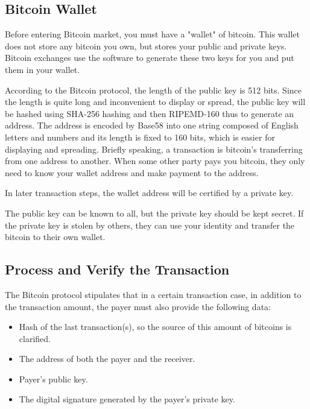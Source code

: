 \documentclass[12pt,a4paper]{article}
\begin{document}
\subsection{Bitcoin Wallet}
Before entering Bitcoin market, you must have a "wallet" of bitcoin. This wallet does not store any bitcoin you own, but stores your public and private keys. 
Bitcoin exchanges use the software to generate these two keys for you and put them in your wallet.

According to the Bitcoin protocol, the length of the public key is 512 bits. Since the length is quite long and inconvenient to display or spread, the public key will be hashed using SHA-256 hashing and then RIPEMD-160 thus to generate an address. The address is encoded by Base58 into one string composed of English letters and numbers and its length is fixed to 160 bits, which is easier for displaying and spreading. Briefly speaking, a transaction is bitcoin's transferring from one address to another. When some other party pays you bitcoin, they only need to know your wallet address and make payment to the address. 

In later transaction steps, the wallet address will be certified by a private key.

The public key can be known to all, but the private key should be kept secret. If the private key is stolen by others, they can use your identity and transfer the bitcoin to their own wallet.

\subsection{Process and Verify the Transaction} 
The Bitcoin protocol stipulates that in a certain transaction case, in addition to the transaction amount, the payer must also provide the following data:
\begin{itemize}
\item Hash of the last transaction(s), so the source of this amount of bitcoins is clarified.
\item The address of both the payer and the receiver.
\item Payer's public key.
\item The digital signature generated by the payer's private key.
\end{itemize}
\end{document}
